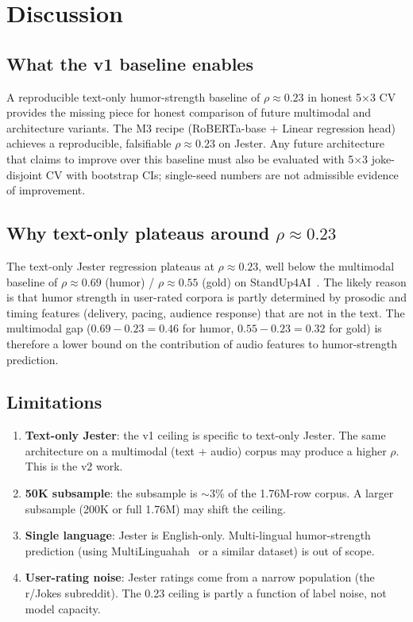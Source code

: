 \documentclass[11pt, letterpaper]{article}
\begin{document}
\section{Discussion}

\subsection{What the v1 baseline enables}

A reproducible text-only humor-strength baseline of $\rho \approx 0.23$ in honest 5$\times$3 CV provides the missing piece for honest comparison of future multimodal and architecture variants. The M3 recipe (RoBERTa-base + Linear regression head) achieves a reproducible, falsifiable $\rho \approx 0.23$ on Jester. Any future architecture that claims to improve over this baseline must also be evaluated with 5$\times$3 joke-disjoint CV with bootstrap CIs; single-seed numbers are not admissible evidence of improvement.

\subsection{Why text-only plateaus around $\rho \approx 0.23$}

The text-only Jester regression plateaus at $\rho \approx 0.23$, well below the multimodal baseline of $\rho \approx 0.69$ (humor) / $\rho \approx 0.55$ (gold) on StandUp4AI~\cite{hahascore-methodology}. The likely reason is that humor strength in user-rated corpora is partly determined by prosodic and timing features (delivery, pacing, audience response) that are not in the text. The multimodal gap ($0.69 - 0.23 = 0.46$ for humor, $0.55 - 0.23 = 0.32$ for gold) is therefore a lower bound on the contribution of audio features to humor-strength prediction.

\subsection{Limitations}

\begin{enumerate}
\item \textbf{Text-only Jester}: the v1 ceiling is specific to text-only Jester. The same architecture on a multimodal (text + audio) corpus may produce a higher $\rho$. This is the v2 work.
\item \textbf{50K subsample}: the subsample is $\sim$3\% of the 1.76M-row corpus. A larger subsample (200K or full 1.76M) may shift the ceiling.
\item \textbf{Single language}: Jester is English-only. Multi-lingual humor-strength prediction (using MultiLinguahah~\cite{multilinguahah} or a similar dataset) is out of scope.
\item \textbf{User-rating noise}: Jester ratings come from a narrow population (the r/Jokes subreddit). The 0.23 ceiling is partly a function of label noise, not model capacity.
\end{enumerate}
\end{document}
